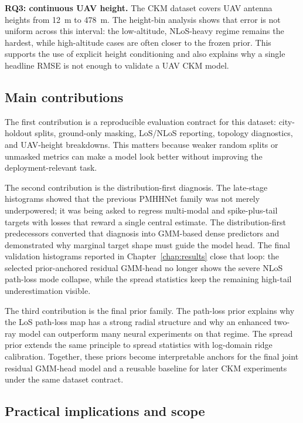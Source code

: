 \textbf{RQ3: continuous UAV height.} The CKM dataset covers UAV antenna heights
from \SI{12}{m} to \SI{478}{m}. The height-bin analysis shows that error is not
uniform across this interval: the low-altitude, NLoS-heavy regime remains the
hardest, while high-altitude cases are often closer to the frozen prior. This
supports the use of explicit height conditioning and also explains why a single
headline RMSE is not enough to validate a UAV CKM model.

\subsection{Main contributions}

The first contribution is a reproducible evaluation contract for this dataset:
city-holdout splits, ground-only masking, LoS/NLoS reporting, topology
diagnostics, and UAV-height breakdowns. This matters because weaker random
splits or unmasked metrics can make a model look better without improving the
deployment-relevant task.

The second contribution is the distribution-first diagnosis. The late-stage
histograms showed that the previous PMHHNet family was not merely underpowered;
it was being asked to regress multi-modal and spike-plus-tail targets with
losses that reward a single central estimate. The distribution-first predecessors converted that
diagnosis into GMM-based dense predictors and demonstrated why marginal target
shape must guide the model head. The final validation histograms reported in
Chapter~\ref{chap:results} close that loop: the selected prior-anchored
residual GMM-head no longer shows the severe NLoS path-loss mode collapse,
while the spread statistics keep the remaining high-tail underestimation
visible.

The third contribution is the final prior family. The path-loss prior explains why the LoS
path-loss map has a strong radial structure and why an enhanced two-ray model
can outperform many neural experiments on that regime. The spread prior extends the same
principle to spread statistics with log-domain ridge calibration. Together,
these priors become interpretable anchors for the final joint residual GMM-head model
and a reusable baseline for later CKM experiments under the same dataset contract.

\subsection{Practical implications and scope}

